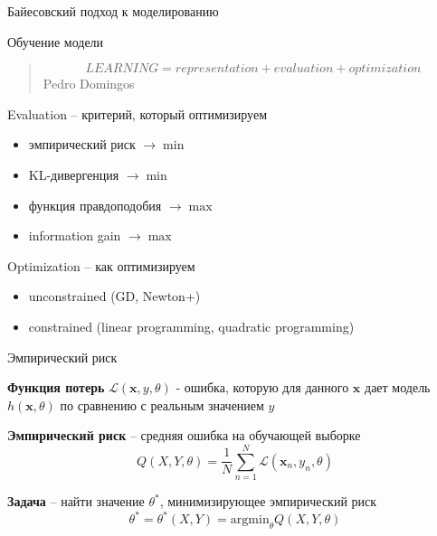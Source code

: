 \documentclass[10pt]{beamer}
\begin{document}
\begin{frame}{Байесовский подход к моделированию}

\end{frame}

\begin{frame}{Обучение модели}

\begin{quote}
\[
LEARNING = representation + evaluation + optimization
\]
\hfill Pedro Domingos
\end{quote}

Evaluation -- критерий, который оптимизируем
\begin{itemize}
\item эмпирический риск $\rightarrow \min$
\item KL-дивергенция $\rightarrow \min$
\item функция правдоподобия $\rightarrow \max$
\item information gain $\rightarrow \max$
\end{itemize}
Optimization -- как оптимизируем
\begin{itemize}
\item unconstrained (GD, Newton+)
\item constrained (linear programming, quadratic programming)
\end{itemize}

\end{frame}

\begin{frame}{Эмпирический риск}

{\bf Функция потерь} $\mathcal{L}(\mathbf{x}, y, \theta)$ - ошибка, которую для данного $\mathbf{x}$ дает модель $h(\mathbf{x}, \theta)$ по сравнению с реальным значением $y$
\vspace{1em}

{\bf Эмпирический риск} -- средняя ошибка на обучающей выборке
\[
Q(X, Y, \theta) = \frac{1}{N} \sum_{n=1}^N \mathcal{L}(\mathbf{x}_n, y_n, \theta)
\]
\vspace{1em}

{\bf Задача} -- найти значение $\theta^*$, минимизирующее эмпирический риск
\[
\theta^* = \theta^*(X, Y) = \text{argmin}_\theta Q(X, Y, \theta)
\]

\end{frame}
\end{document}
